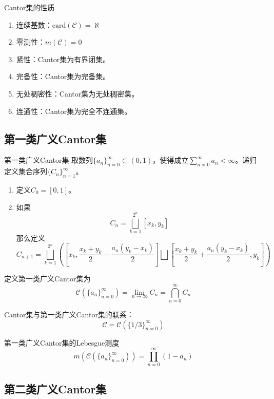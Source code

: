 \documentclass[lang = cn, scheme = chinese, thmcnt = section]{elegantbook}
\newcommand{\sub}{\subset}             %
\newcommand{\dis}{\displaystyle}
\newcommand{\card}{\mathrm{card}}
\begin{document}
\begin{theorem}{Cantor集的性质}
	\begin{enumerate}
		\item 连续基数：$\card(\mathcal{C})=\aleph$
		\item 零测性：$m(\mathcal{C})=0$
		\item 紧性：Cantor集为有界闭集。
		\item 完备性：Cantor集为完备集。
		\item 无处稠密性：Cantor集为无处稠密集。
		\item 连通性：Cantor集为完全不连通集。
	\end{enumerate}
\end{theorem}

\subsection{第一类广义Cantor集}

\begin{definition}{第一类广义Cantor集}
	取数列$\{a_n\}_{n=0}^{\infty}\sub (0,1)$，使得成立$\dis\sum_{n=0}^{\infty}a_n<\infty$。递归定义集合序列$\{ C_n \}_{n=1}^{\infty}$。
	\begin{enumerate}
		\item 定义$C_0=[0,1]$。
		\item 如果%
		$$
		C_{n}=\bigsqcup_{k=1}^{2^{n}}[x_k,y_k]
		$$
		那么定义%
		$$
		C_{n+1}=\bigsqcup_{k=1}^{2^{n}}
		\left(
		\left[x_k,\frac{x_k+y_k}{2}-\frac{a_n(y_k-x_k)}{2}\right]
		\bigsqcup
		\left[\frac{x_k+y_k}{2}+\frac{a_n(y_k-x_k)}{2},y_k\right]
		\right)
		$$
	\end{enumerate}
	定义第一类广义Cantor集为%
	$$
	\mathcal{C}(\{a_n\}_{n=0}^{\infty})
	=\lim_{n\to\infty}C_n=\bigcap_{n=0}^{\infty}C_n
	$$
\end{definition}

\begin{note}
	Cantor集与第一类广义Cantor集的联系：%
	$$
	\mathcal{C}
	=\mathcal{C}(\{1/3\}_{n=0}^{\infty})
	$$
\end{note}

\begin{theorem}{第一类广义Cantor集的Lebesgue测度}
	$$
	m(\mathcal{C}(\{a_n\}_{n=0}^{\infty}))=\prod_{n=0}^{\infty}(1-a_n)
	$$
\end{theorem}

\subsection{第二类广义Cantor集}
\end{document}
